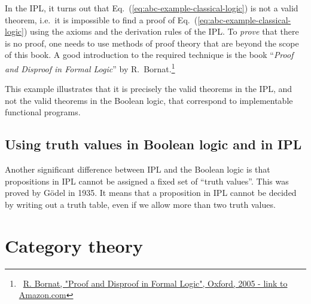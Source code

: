 In the IPL, it turns out that Eq.~(\ref{eq:abc-example-classical-logic})
is not a valid theorem, i.e.~it is impossible to find a proof of
Eq.~(\ref{eq:abc-example-classical-logic}) using the axioms and
the derivation rules of the IPL. To \emph{prove} that there is no
proof, one needs to use methods of proof theory that are beyond the
scope of this book. A good introduction to the required technique
is the book ``\emph{Proof and Disproof in Formal Logic}'' by R.~Bornat.\footnote{~\href{https://www.amazon.com/Proof-Disproof-Formal-Logic-Introduction/dp/0198530277}{R. Bornat, "Proof and Disproof in Formal Logic", Oxford, 2005 - link to Amazon.com}} 

This example illustrates that it is precisely the valid theorems in
the IPL, and not the valid theorems in the Boolean logic, that correspond
to implementable functional programs.

\section{Using truth values in Boolean logic and in IPL}

Another significant difference between IPL and the Boolean logic is
that propositions in IPL cannot be assigned a fixed set of ``truth
values''. This was proved by Gödel in 1935. It means that a proposition
in IPL cannot be decided by writing out a truth table, even if we
allow more than two truth values.

\chapter{Category theory}

